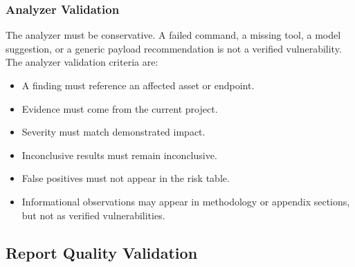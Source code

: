 \documentclass[12pt,a4paper]{report}
\begin{document}
\subsubsection{Analyzer Validation}

The analyzer must be conservative. A failed command, a missing tool, a model
suggestion, or a generic payload recommendation is not a verified vulnerability. The
analyzer validation criteria are:

\begin{itemize}
    \item A finding must reference an affected asset or endpoint.
    \item Evidence must come from the current project.
    \item Severity must match demonstrated impact.
    \item Inconclusive results must remain inconclusive.
    \item False positives must not appear in the risk table.
    \item Informational observations may appear in methodology or appendix sections,
    but not as verified vulnerabilities.
\end{itemize}

\subsection{Report Quality Validation}
\end{document}
